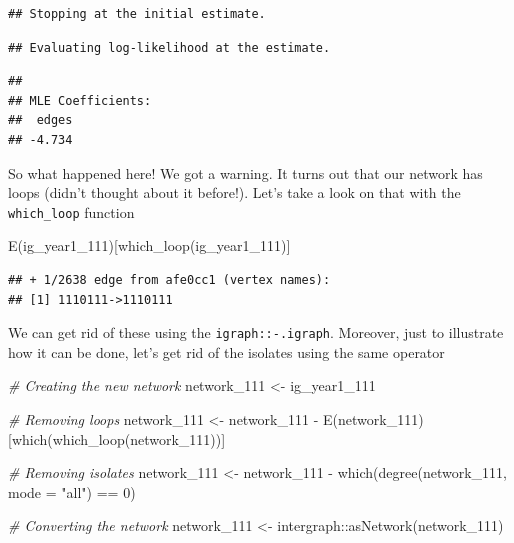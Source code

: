 \documentclass[
]{book}
\newenvironment{Shaded}{\begin{snugshade}}{\end{snugshade}}
\newcommand{\AttributeTok}[1]{\textcolor[rgb]{0.77,0.63,0.00}{#1}}
\newcommand{\CommentTok}[1]{\textcolor[rgb]{0.56,0.35,0.01}{\textit{#1}}}
\newcommand{\DecValTok}[1]{\textcolor[rgb]{0.00,0.00,0.81}{#1}}
\newcommand{\FunctionTok}[1]{\textcolor[rgb]{0.00,0.00,0.00}{#1}}
\newcommand{\NormalTok}[1]{#1}
\newcommand{\OtherTok}[1]{\textcolor[rgb]{0.56,0.35,0.01}{#1}}
\newcommand{\SpecialCharTok}[1]{\textcolor[rgb]{0.00,0.00,0.00}{#1}}
\newcommand{\StringTok}[1]{\textcolor[rgb]{0.31,0.60,0.02}{#1}}
\begin{document}
\begin{verbatim}
## Stopping at the initial estimate.
\end{verbatim}

\begin{verbatim}
## Evaluating log-likelihood at the estimate.
\end{verbatim}

\begin{verbatim}
## 
## MLE Coefficients:
##  edges  
## -4.734
\end{verbatim}

So what happened here! We got a warning. It turns out that our network has loops (didn't thought about it before!). Let's take a look on that with the \texttt{which\_loop} function

\begin{Shaded}
\begin{Highlighting}[]
\FunctionTok{E}\NormalTok{(ig\_year1\_111)[}\FunctionTok{which\_loop}\NormalTok{(ig\_year1\_111)]}
\end{Highlighting}
\end{Shaded}

\begin{verbatim}
## + 1/2638 edge from afe0cc1 (vertex names):
## [1] 1110111->1110111
\end{verbatim}

We can get rid of these using the \texttt{igraph::-.igraph}. Moreover, just to illustrate how it can be done, let's get rid of the isolates using the same operator

\begin{Shaded}
\begin{Highlighting}[]
\CommentTok{\# Creating the new network}
\NormalTok{network\_111 }\OtherTok{\textless{}{-}}\NormalTok{ ig\_year1\_111}

\CommentTok{\# Removing loops}
\NormalTok{network\_111 }\OtherTok{\textless{}{-}}\NormalTok{ network\_111 }\SpecialCharTok{{-}} \FunctionTok{E}\NormalTok{(network\_111)[}\FunctionTok{which}\NormalTok{(}\FunctionTok{which\_loop}\NormalTok{(network\_111))]}

\CommentTok{\# Removing isolates}
\NormalTok{network\_111 }\OtherTok{\textless{}{-}}\NormalTok{ network\_111 }\SpecialCharTok{{-}} \FunctionTok{which}\NormalTok{(}\FunctionTok{degree}\NormalTok{(network\_111, }\AttributeTok{mode =} \StringTok{"all"}\NormalTok{) }\SpecialCharTok{==} \DecValTok{0}\NormalTok{)}

\CommentTok{\# Converting the network}
\NormalTok{network\_111 }\OtherTok{\textless{}{-}}\NormalTok{ intergraph}\SpecialCharTok{::}\FunctionTok{asNetwork}\NormalTok{(network\_111)}
\end{Highlighting}
\end{Shaded}
\end{document}
